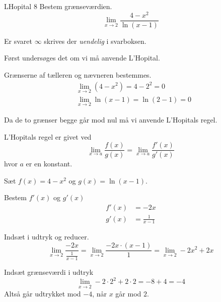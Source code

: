 \documentclass{article}
\begin{document}
\begin{exercise}{LHopital 8}
Bestem grænseværdien.
\[
\lim_{x \to 2} \frac{4 - x^2}{\ln(x - 1)}
\] 

Er svaret $\infty$ skrives der \emph{uendelig} i svarboksen.


\hint
Først undersøges det om vi må anvende L'Hopital.

\hint
Grænserne af tælleren og nævneren bestemmes.
\begin{align*}
	&\lim_{x \to 2} (4 - x^2) = 4 - 2^2 = 0 \\
	&\lim_{x \to 2} \ln(x - 1) = \ln(2 - 1) = 0
\end{align*}

\hint
Da de to grænser begge går mod nul må vi  anvende L'Hopitals regel. 

\hint
L'Hopitals regel er givet ved
\[
\lim_{x \to a} \frac{f(x)}{g(x)} = \lim_{x \to a} \frac{f'(x)}{g'(x)} 
\]
hvor $a$  er en konstant.

\hint
Sæt $f(x) = 4 - x^2$ og $g(x) = \ln(x-1)$. 

\hint
Bestem $f'(x)$ og $g'(x)$
\begin{align*}
	f'(x) &= -2 x \\
	g'(x) &= \frac{1}{x-1}
\end{align*}

\hint
Indsæt i udtryk og reducer. 
\[
\lim_{x \to 2} \frac{-2x}{\frac{1}{x-1}} = \lim_{x \to 2} \frac{-2x \cdot (x-1)}{1} = \lim_{x \to 2} -2x^2 + 2x
\]

\hint
Indsæt grænseværdi i udtryk
\[
\lim_{x \to 2} -2 \cdot 2^2 + 2 \cdot 2 = -8 + 4 = -4
\]
Altså går udtrykket mod $-4$, når $x$ går mod $2$. 

\end{exercise}
\end{document}

